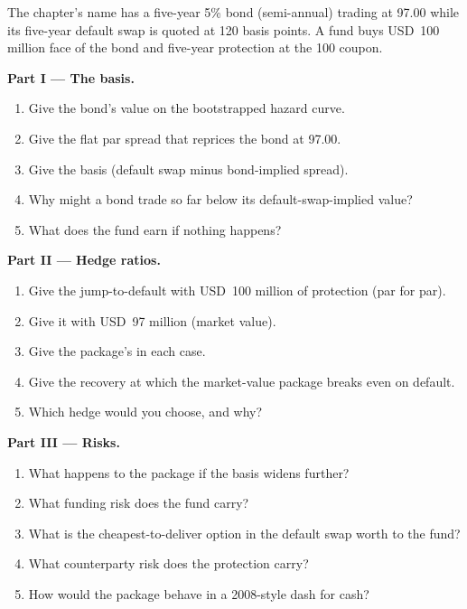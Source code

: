 \begin{problem}\label{pb:rc:reduced-form-credit:1}
The chapter's name has a five-year 5\% bond (semi-annual) trading at 97.00 while its
five-year default swap is quoted at 120 basis points. A fund buys USD~100 million face of
the bond and five-year protection at the 100 coupon.

\medskip\noindent\textbf{Part I --- The basis.}
\begin{enumerate}
\item Give the bond's value on the bootstrapped hazard curve.
\item Give the flat par spread that reprices the bond at 97.00.
\item Give the basis (default swap minus bond-implied spread).
\item Why might a bond trade so far below its default-swap-implied value?
\item What does the fund earn if nothing happens?
\end{enumerate}

\medskip\noindent\textbf{Part II --- Hedge ratios.}
\begin{enumerate}[resume]
\item Give the jump-to-default with USD~100 million of protection (par for par).
\item Give it with USD~97 million (market value).
\item Give the package's  in each case.
\item Give the recovery at which the market-value package breaks even on default.
\item Which hedge would you choose, and why?
\end{enumerate}

\medskip\noindent\textbf{Part III --- Risks.}
\begin{enumerate}[resume]
\item What happens to the package if the basis widens further?
\item What funding risk does the fund carry?
\item What is the cheapest-to-deliver option in the default swap worth to the fund?
\item What counterparty risk does the protection carry?
\item How would the package behave in a 2008-style dash for cash?
\end{enumerate}


\end{problem}

